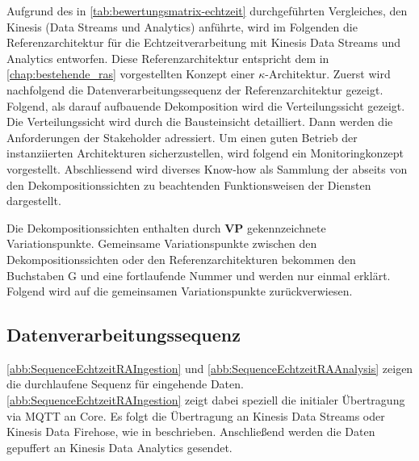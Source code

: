 Aufgrund des in \autoref{tab:bewertungsmatrix-echtzeit} durchgeführten Vergleiches, den Kinesis (Data Streams und Analytics) anführte, wird im Folgenden die Referenzarchitektur für die Echtzeitverarbeitung mit Kinesis Data Streams und Analytics entworfen. Diese Referenzarchitektur entspricht dem in \autoref{chap:bestehende_ras} vorgestellten Konzept einer $\kappa$-Architektur. Zuerst wird nachfolgend die Datenverarbeitungssequenz der Referenzarchitektur gezeigt. Folgend, als darauf aufbauende Dekomposition wird die Verteilungssicht gezeigt. Die Verteilungssicht wird durch die Bausteinsicht detailliert. Dann werden die Anforderungen der Stakeholder adressiert. Um einen guten Betrieb der instanziierten Architekturen sicherzustellen, wird folgend ein Monitoringkonzept vorgestellt. Abschliessend wird diverses Know-how als Sammlung der abseits von den Dekompositionssichten zu beachtenden Funktionsweisen der Diensten dargestellt.

Die Dekompositionssichten enthalten durch \textbf{VP} gekennzeichnete Variationspunkte. Gemeinsame Variationspunkte zwischen den Dekompositionssichten oder den Referenzarchitekturen bekommen den Buchstaben G und eine fortlaufende Nummer und werden nur einmal erklärt. Folgend wird auf die gemeinsamen Variationspunkte zurückverwiesen.

\subsection{Datenverarbeitungssequenz}\label{subsection:Datenverarbeitungssequen-E}
\autoref{abb:SequenceEchtzeitRAIngestion} und \autoref{abb:SequenceEchtzeitRAAnalysis} zeigen die durchlaufene Sequenz für eingehende Daten. \autoref{abb:SequenceEchtzeitRAIngestion} zeigt dabei speziell die initialer Übertragung via \ac{MQTT} an \AWSIOT{} Core. Es folgt die Übertragung an Kinesis Data Streams oder Kinesis Data Firehose, wie in  beschrieben. Anschließend werden die Daten gepuffert an Kinesis Data Analytics gesendet. 

